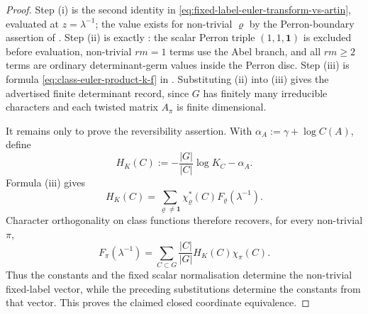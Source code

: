 \documentclass[11pt,a4paper]{amsart}
\theoremstyle{plain}
\theoremstyle{definition}
\theoremstyle{remark}
\begin{document}
\begin{proof}
  Step \textup{(i)} is the second identity in
  \eqref{eq:fixed-label-euler-transform-vs-artin}, evaluated at
  \(z=\lambda^{-1}\); the value exists for non-trivial \(\varrho\) by the
  Perron-boundary assertion of .  Step
  \textup{(ii)} is exactly : the
  scalar Perron triple \((1,1,\mathbf1)\) is excluded before evaluation,
  non-trivial \(rm=1\) terms use the Abel branch, and all \(rm\ge2\) terms are
  ordinary determinant-germ values inside the Perron disc.  Step
  \textup{(iii)} is formula \eqref{eq:class-euler-product-k-f} in
  .  Substituting \textup{(ii)} into
  \textup{(iii)} gives the advertised finite determinant record, since
  \(G\) has finitely many irreducible characters and each twisted matrix
  \(A_\pi\) is finite dimensional.

  It remains only to prove the reversibility assertion.  With
  \(\alpha_A:=\gamma+\log C(A)\), define
  \[
    H_K(C):=-\frac{|G|}{|C|}\log K_C-\alpha_A .
  \]
  Formula \textup{(iii)} gives
  \[
    H_K(C)=
    \sum_{\varrho\ne\mathbf1}\chi_\varrho^\ast(C)
      F_\varrho(\lambda^{-1}).
  \]
  Character orthogonality on class functions therefore recovers, for every
  non-trivial \(\pi\),
  \[
    F_\pi(\lambda^{-1})
    =\sum_{C\subset G}\frac{|C|}{|G|}H_K(C)\chi_\pi(C).
  \]
  Thus the constants and the fixed scalar normalisation determine the
  non-trivial fixed-label vector, while the preceding substitutions determine
  the constants from that vector.  This proves the claimed closed coordinate equivalence.
\end{proof}
\end{document}
